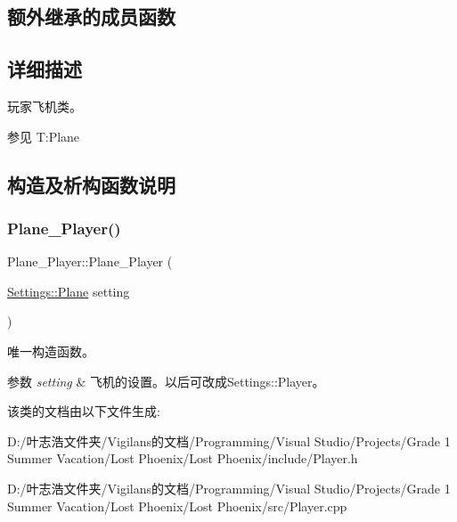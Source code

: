 \subsection*{额外继承的成员函数}


\subsection{详细描述}
玩家飞机类。 

\begin{DoxySeeAlso}{参见}
T\+:\+Plane


\end{DoxySeeAlso}


\subsection{构造及析构函数说明}
\mbox{\label{class_plane___player_ae07c92eb62cd45f7fd5d12fb570934e2}} 
\subsubsection{\texorpdfstring{Plane\+\_\+\+Player()}{Plane\_Player()}}
{\footnotesize\ttfamily Plane\+\_\+\+Player\+::\+Plane\+\_\+\+Player (\begin{DoxyParamCaption}\item[{\hyperlink{struct_settings_1_1_plane}{Settings\+::\+Plane}}]{setting }\end{DoxyParamCaption})}



唯一构造函数。 


\begin{DoxyParams}{参数}
{\em setting} & 飞机的设置。以后可改成{\ttfamily Settings\+::\+Player}。 \\
\hline
\end{DoxyParams}


该类的文档由以下文件生成\+:\begin{DoxyCompactItemize}
\item 
D\+:/叶志浩文件夹/\+Vigilans的文档/\+Programming/\+Visual Studio/\+Projects/\+Grade 1 Summer Vacation/\+Lost Phoenix/\+Lost Phoenix/include/Player.\+h\item 
D\+:/叶志浩文件夹/\+Vigilans的文档/\+Programming/\+Visual Studio/\+Projects/\+Grade 1 Summer Vacation/\+Lost Phoenix/\+Lost Phoenix/src/Player.\+cpp\end{DoxyCompactItemize}
